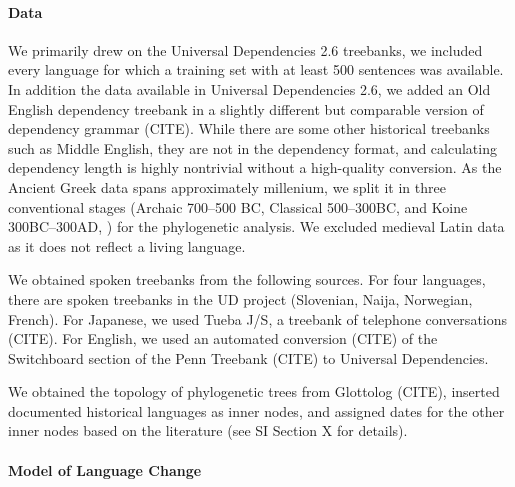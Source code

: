 \documentclass[11pt,a4paper]{article}
\begin{document}




\paragraph{Data}
We primarily drew on the Universal Dependencies 2.6 treebanks, we included every language for which a training set with at least 500 sentences was available.
In addition the data available in Universal Dependencies 2.6, we added an Old English dependency treebank in a slightly different but comparable version of dependency grammar (CITE).
While there are some other historical treebanks such as Middle English, they are not in the dependency format, and calculating dependency length is highly nontrivial without a high-quality conversion.
As the Ancient Greek data spans approximately millenium, we split it in three conventional stages (Archaic 700--500 BC, Classical 500--300BC, and Koine 300BC--300AD, \citet{taylor1994change}) for the phylogenetic analysis. 
We excluded medieval Latin data as it does not reflect a living language.

We obtained spoken treebanks from the following sources.
For four languages, there are spoken treebanks in the UD project (Slovenian, Naija, Norwegian, French). For Japanese, we used Tueba J/S, a treebank of telephone conversations (CITE). For English, we used an automated conversion (CITE) of the Switchboard section of the Penn Treebank (CITE) to Universal Dependencies.

We obtained the topology of phylogenetic trees from Glottolog (CITE), inserted documented historical languages as inner nodes, and assigned dates for the other inner nodes based on the literature (see SI Section X for details).

\paragraph{Model of Language Change}

\end{document}
